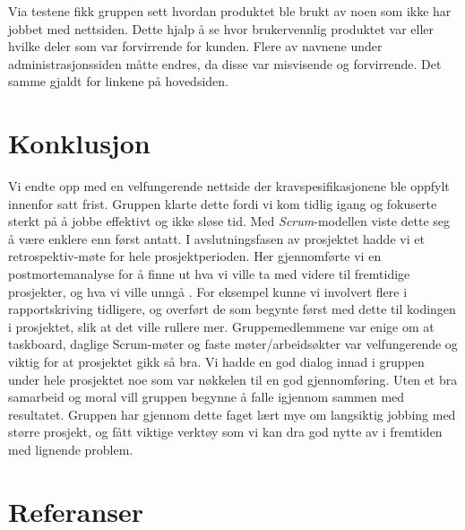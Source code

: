 \documentclass[12pt,a4paper,norsk]{article}
\begin{document}
Via testene fikk gruppen sett hvordan produktet ble brukt av noen som ikke har jobbet med nettsiden. Dette hjalp å se hvor brukervennlig produktet var eller hvilke deler som var forvirrende for kunden. Flere av navnene under administrasjonssiden måtte endres, da disse var misvisende og forvirrende. Det samme gjaldt for linkene på hovedsiden.

\section{Konklusjon}
Vi endte opp med en velfungerende nettside der kravspesifikasjonene ble oppfylt innenfor satt frist. Gruppen klarte dette fordi vi kom tidlig igang og fokuserte sterkt på å jobbe effektivt og ikke sløse tid. Med \textit{Scrum}-modellen viste dette seg å være enklere enn først antatt. I avslutningsfasen av prosjektet hadde vi et retrospektiv-møte for hele prosjektperioden. Her gjennomførte vi en postmortemanalyse for å finne ut hva vi ville ta med videre til fremtidige prosjekter, og hva vi ville unngå \cite[side 37]{dyba}. For eksempel kunne vi involvert flere i rapportskriving tidligere, og overført de som begynte først med dette til kodingen i prosjektet, slik at det ville rullere mer. Gruppemedlemmene var enige om at taskboard, daglige Scrum-møter og faste møter/arbeidsøkter var velfungerende og viktig for at prosjektet gikk så bra. Vi hadde en god dialog innad i gruppen under hele prosjektet noe som var nøkkelen til en god gjennomføring. Uten et bra samarbeid og moral vill gruppen begynne å falle igjennom sammen med resultatet. Gruppen har gjennom dette faget lært mye om langsiktig jobbing med større prosjekt, og fått viktige verktøy som vi kan dra god nytte av i fremtiden med lignende problem.


\newpage
{}
\section{Referanser}


\end{document}
